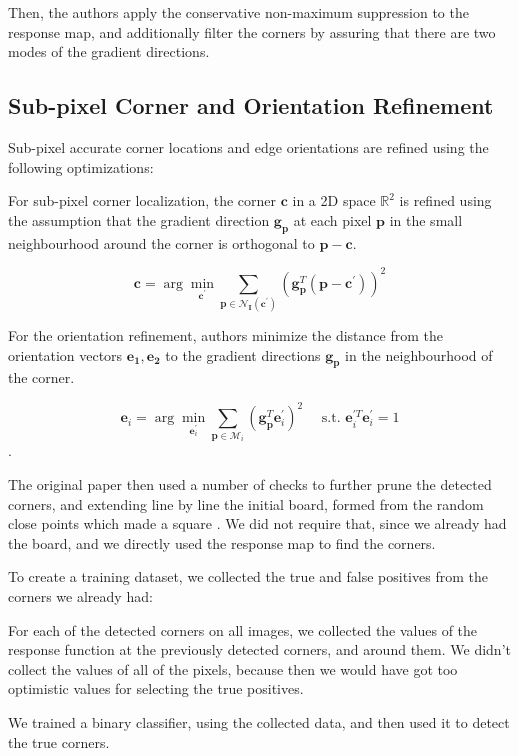 Then, the authors apply the conservative non-maximum suppression to the
response map, and additionally filter the corners by assuring that there are two
modes of the gradient directions.

\subsection{Sub-pixel Corner and Orientation Refinement}\label{sub:sub_pixel_corner_and_orientation_refinement}

Sub-pixel accurate corner locations and edge orientations are refined using the following optimizations:

For sub-pixel corner localization, the corner $\mathbf{c}$ in a 2D space
$\mathbb{R}^2$ is refined using the assumption that the gradient direction
\(\mathbf{g_{p}}\) at
each pixel  \(\mathbf{p}\) in the small neighbourhood around the corner is
orthogonal to \(\mathbf{p} - \mathbf{c}\).

\begin{equation}
	\mathbf{c}=\arg \min _{\mathbf{c}^{\prime}} \sum_{\mathbf{p} \in
	\mathcal{N}_{\mathbf{I}}\left(\mathbf{c}^{\prime}\right)}\left(\mathbf{g}_{\mathbf{p}}^T\left(\mathbf{p}-\mathbf{c}^{\prime}\right)\right)^2
\end{equation}

For the orientation refinement, authors minimize the distance from the
orientation vectors \(\mathbf{e_1}, \mathbf{e_2}\) to the gradient directions
\(\mathbf{g_p}\) in the neighbourhood of the corner.

\begin{equation}
	\mathbf{e}_i=\arg \min _{\mathbf{e}_i^{\prime}} \sum_{\mathbf{p} \in
		\mathcal{M}_i}\left(\mathbf{g}_{\mathbf{p}}^T \mathbf{e}_i^{\prime}\right)^2
	\quad \text { s.t. } \mathbf{e}_i^{\prime T} \mathbf{e}_i^{\prime}=1
\end{equation}.

The original paper then used a number of checks to further prune the detected
corners, and extending line by line the initial board, formed from the
random close points which made a square .
We did not require that, since we already had the board, and we directly used
the response map to find the corners.


To create a training dataset, we collected the true and false positives from the
corners we already had:

For each of the detected corners on all images, we collected the values of the
response function at the previously detected corners, and around them.
We didn't collect the values of all of the pixels, because then we would have
got too optimistic values for selecting the true positives.


We trained a binary classifier, using the collected data, and then used it to
detect the true corners.


